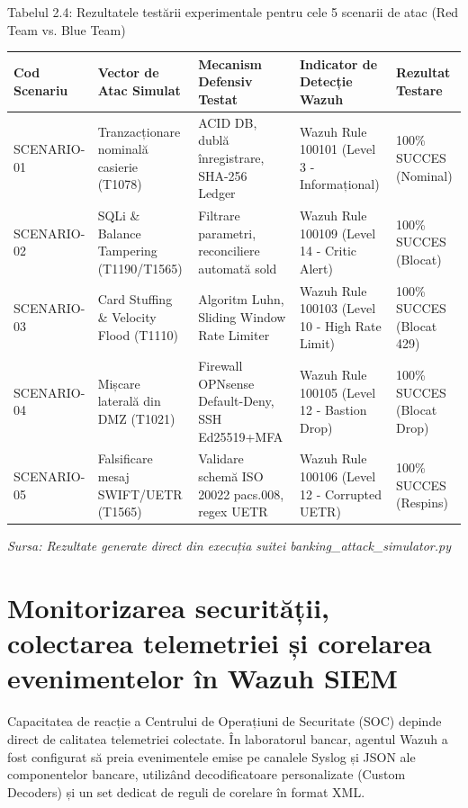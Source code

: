 Tabelul 2.4: Rezultatele testării experimentale pentru cele 5 scenarii de atac (Red Team vs. Blue Team)

\begin{table}[htbp]
\centering
\small
\begin{tabular}{p{} p{} p{} p{} p{}}
\toprule
Cod Scenariu & Vector de Atac Simulat & Mecanism Defensiv Testat & Indicator de Detecție Wazuh & Rezultat Testare \\
\midrule
SCENARIO-01 & Tranzacționare nominală casierie (T1078) & ACID DB, dublă înregistrare, SHA-256 Ledger & Wazuh Rule 100101 (Level 3 - Informațional) & 100\% SUCCES (Nominal) \\
SCENARIO-02 & SQLi \& Balance Tampering (T1190/T1565) & Filtrare parametri, reconciliere automată sold & Wazuh Rule 100109 (Level 14 - Critic Alert) & 100\% SUCCES (Blocat) \\
SCENARIO-03 & Card Stuffing \& Velocity Flood (T1110) & Algoritm Luhn, Sliding Window Rate Limiter & Wazuh Rule 100103 (Level 10 - High Rate Limit) & 100\% SUCCES (Blocat 429) \\
SCENARIO-04 & Mișcare laterală din DMZ (T1021) & Firewall OPNsense Default-Deny, SSH Ed25519+MFA & Wazuh Rule 100105 (Level 12 - Bastion Drop) & 100\% SUCCES (Blocat Drop) \\
SCENARIO-05 & Falsificare mesaj SWIFT/UETR (T1565) & Validare schemă ISO 20022 pacs.008, regex UETR & Wazuh Rule 100106 (Level 12 - Corrupted UETR) & 100\% SUCCES (Respins) \\
\bottomrule
\end{tabular}
\end{table}

\textit{Sursa: Rezultate generate direct din execuția suitei banking\_attack\_simulator.py}

\section{Monitorizarea securității, colectarea telemetriei și corelarea evenimentelor în Wazuh SIEM}

Capacitatea de reacție a Centrului de Operațiuni de Securitate (SOC) depinde direct de calitatea telemetriei colectate. În laboratorul bancar, agentul Wazuh a fost configurat să preia evenimentele emise pe canalele Syslog și JSON ale componentelor bancare, utilizând decodificatoare personalizate (Custom Decoders) și un set dedicat de reguli de corelare în format XML.

